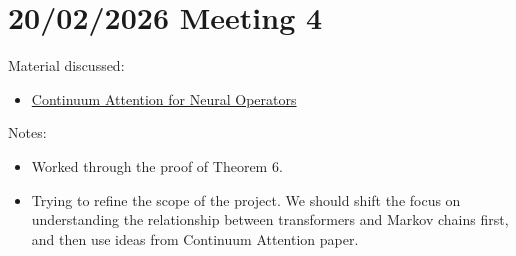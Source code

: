 \documentclass{article}
\begin{document}
\section{20/02/2026 Meeting 4}
Material discussed:
\begin{itemize}
    \item \href{https://arxiv.org/abs/2406.06486}{Continuum Attention for Neural Operators}
\end{itemize}
Notes:
\begin{itemize}
    \item Worked through the proof of Theorem 6.
    \item Trying to refine the scope of the project. We should shift the focus on understanding the relationship between transformers and Markov chains first, and then use ideas from Continuum Attention paper.
\end{itemize}
\end{document}
